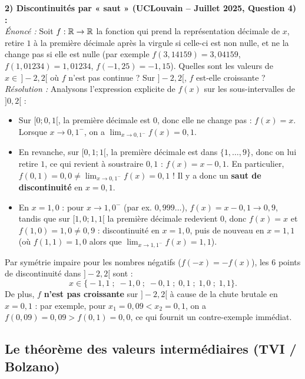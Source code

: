 \begin{exemple}
\medskip
\textbf{2) Discontinuités par « saut » (UCLouvain -- Juillet 2025, Question 4) :}\\
\emph{Énoncé :} Soit $f : \mathbb{R} \to \mathbb{R}$ la fonction qui prend la représentation décimale de $x$, retire $1$ à la première décimale après la virgule si celle-ci est non nulle, et ne la change pas si elle est nulle (par exemple $f(3,14159) = 3,04159$, $f(1,01234) = 1,01234$, $f(-1,25) = -1,15$). Quelles sont les valeurs de $x \in \,]-2, 2[$ où $f$ n'est pas continue ? Sur $]-2, 2[$, $f$ est-elle croissante ?\\
\emph{Résolution :} Analysons l'expression explicite de $f(x)$ sur les sous-intervalles de $]0, 2[$ :
\begin{itemize}
    \item Sur $[0; 0,1[$, la première décimale est $0$, donc elle ne change pas : $f(x) = x$. Lorsque $x \to 0,1^-$, on a $\lim_{x \to 0,1^-} f(x) = 0,1$.
    \item En revanche, sur $[0,1; 1[$, la première décimale est dans $\{1, \dots, 9\}$, donc on lui retire $1$, ce qui revient à soustraire $0,1$ : $f(x) = x - 0,1$. En particulier, $f(0,1) = 0,0 \neq \lim_{x \to 0,1^-} f(x) = 0,1$ ! Il y a donc un \textbf{saut de discontinuité} en $x = 0,1$.
    \item En $x = 1,0$ : pour $x \to 1,0^-$ (par ex. $0,999\dots$), $f(x) = x - 0,1 \to 0,9$, tandis que sur $[1,0; 1,1[$ la première décimale redevient $0$, donc $f(x) = x$ et $f(1,0) = 1,0 \neq 0,9$ : discontinuité en $x = 1,0$, puis de nouveau en $x = 1,1$ (où $f(1,1) = 1,0$ alors que $\lim_{x \to 1,1^-} f(x) = 1,1$).
\end{itemize}
Par symétrie impaire pour les nombres négatifs ($f(-x) = -f(x)$), les $6$ points de discontinuité dans $]-2, 2[$ sont :
\[
    \boxed{x \in \bigl\{-1,1 \;;\; -1,0 \;;\; -0,1 \;;\; 0,1 \;;\; 1,0 \;;\; 1,1\bigr\}}.
\]
De plus, $f$ \textbf{n'est pas croissante} sur $]-2, 2[$ à cause de la chute brutale en $x = 0,1$ : par exemple, pour $x_1 = 0,09 < x_2 = 0,1$, on a $f(0,09) = 0,09 > f(0,1) = 0,0$, ce qui fournit un contre-exemple immédiat.
\end{exemple}

\subsection{Le théorème des valeurs intermédiaires (TVI / Bolzano)}

